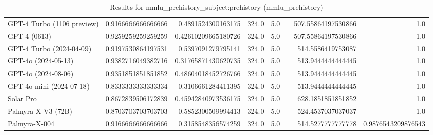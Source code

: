 \begin{table}[htp]
{\begin{tabular}{lrrrrrrr}
GPT-4 Turbo (1106 preview) & 0.9166666666666666 & 0.4891524300163175 & 324.0 & 5.0 &  & 507.55864197530866 & 1.0 \\
GPT-4 (0613) & 0.9259259259259259 & 0.42610209665180726 & 324.0 & 5.0 &  & 507.55864197530866 & 1.0 \\
GPT-4 Turbo (2024-04-09) & 0.9197530864197531 & 0.5397091279795141 & 324.0 & 5.0 &  & 514.5586419753087 & 1.0 \\
GPT-4o (2024-05-13) & 0.9382716049382716 & 0.31765871430620735 & 324.0 & 5.0 &  & 513.9444444444445 & 1.0 \\
GPT-4o (2024-08-06) & 0.9351851851851852 & 0.48604018452726766 & 324.0 & 5.0 &  & 513.9444444444445 & 1.0 \\
GPT-4o mini (2024-07-18) & 0.8333333333333334 & 0.3106661284411395 & 324.0 & 5.0 &  & 513.9444444444445 & 1.0 \\
Solar Pro & 0.8672839506172839 & 0.45942840973536175 & 324.0 & 5.0 &  & 628.1851851851852 & 1.0 \\
Palmyra X V3 (72B) & 0.8703703703703703 & 0.5852300509994413 & 324.0 & 5.0 &  & 524.4537037037037 & 1.0 \\
Palmyra-X-004 & 0.9166666666666666 & 0.3158548356574259 & 324.0 & 5.0 &  & 514.5277777777778 & 0.9876543209876543 \\
\bottomrule
\end{tabular}}
\caption{Results for mmlu_prehistory_subject:prehistory (mmlu_prehistory)}
\label{fig:mmlu_prehistory_subject:prehistory (mmlu_prehistory)}
\end{table}